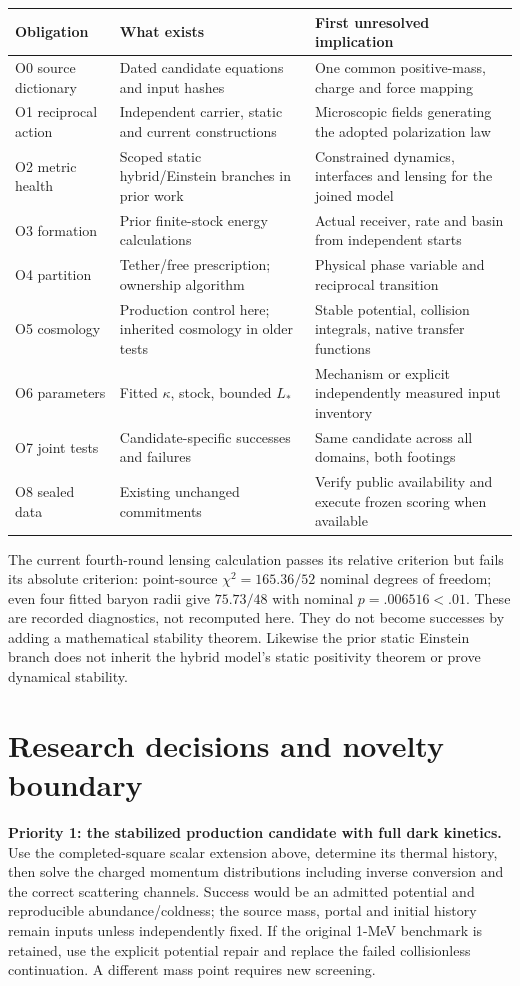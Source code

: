\documentclass[11pt]{article}
\begin{document}
\begin{longtable}{p{}p{}p{}}
\toprule Obligation & What exists & First unresolved implication\\\midrule
\endhead
O0 source dictionary & Dated candidate equations and input hashes & One common positive-mass, charge and force mapping\\
O1 reciprocal action & Independent carrier, static and current constructions & Microscopic fields generating the adopted polarization law\\
O2 metric health & Scoped static hybrid/Einstein branches in prior work & Constrained dynamics, interfaces and lensing for the joined model\\
O3 formation & Prior finite-stock energy calculations & Actual receiver, rate and basin from independent starts\\
O4 partition & Tether/free prescription; ownership algorithm & Physical phase variable and reciprocal transition\\
O5 cosmology & Production control here; inherited cosmology in older tests & Stable potential, collision integrals, native transfer functions\\
O6 parameters & Fitted $\kappa$, stock, bounded $L_*$ & Mechanism or explicit independently measured input inventory\\
O7 joint tests & Candidate-specific successes and failures & Same candidate across all domains, both footings\\
O8 sealed data & Existing unchanged commitments & Verify public availability and execute frozen scoring when available\\
\bottomrule
\end{longtable}

The current fourth-round lensing calculation passes its relative criterion
but fails its absolute criterion: point-source $\chi^2=165.36/52$ nominal
degrees of freedom; even four fitted baryon radii give $75.73/48$ with
nominal $p=.006516<.01$. These are recorded diagnostics, not recomputed here.
They do not become successes by adding a mathematical stability theorem.
Likewise the prior static Einstein branch does not inherit the hybrid
model's static positivity theorem or prove dynamical stability.

\section{Research decisions and novelty boundary}
\textbf{Priority 1: the stabilized production candidate with full dark kinetics.}
Use the completed-square scalar extension above, determine its thermal
history, then solve the charged momentum distributions including
inverse conversion and the correct scattering channels. Success would be
an admitted potential and reproducible abundance/coldness; the source mass,
portal and initial history remain inputs unless independently fixed.
If the original 1-MeV benchmark is retained, use the explicit potential
repair and replace the failed collisionless continuation. A different mass
point requires new screening.
\end{document}
